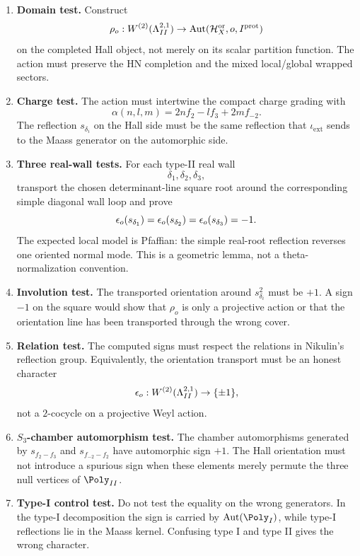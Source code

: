\begin{enumerate}
\item \textbf{Domain test.}  Construct
\[
\rho_o:W^{(2)}(\Lambda^{2,1}_{II})\to\operatorname{Aut}(\mathcal H_X^{\mathrm{or}},o,I^{\mathrm{prot}})
\]
on the completed Hall object, not merely on its scalar partition
function.  The action must preserve the HN completion and the mixed
local/global wrapped sectors.

\item \textbf{Charge test.}  The action must intertwine the compact
charge grading with
\[
        \alpha(n,l,m)=2nf_2-lf_3+2mf_{-2}.
\]
The reflection \(s_{\delta_i}\) on the Hall side must be the same
reflection that \(\iota_{\mathrm{ext}}\) sends to the Maass generator on
the automorphic side.

\item \textbf{Three real-wall tests.}  For each type-II real wall
\[
\delta_1,\delta_2,\delta_3,
\]
transport the chosen determinant-line square root around the corresponding
simple diagonal wall loop and prove
\[
        \epsilon_o(s_{\delta_1})
        =
        \epsilon_o(s_{\delta_2})
        =
        \epsilon_o(s_{\delta_3})
        =
        -1 .
\]
The expected local model is Pfaffian: the simple real-root reflection
reverses one oriented normal mode.  This is a geometric lemma, not a
theta-normalization convention.

\item \textbf{Involution test.}  The transported orientation around
\(s_{\delta_i}^2\) must be \(+1\).  A sign \(-1\) on the square would
show that \(\rho_o\) is only a projective action or that the orientation
line has been transported through the wrong cover.

\item \textbf{Relation test.}  The computed signs must respect the
relations in Nikulin's reflection group.  Equivalently, the orientation
transport must be an honest character
\[
        \epsilon_o:W^{(2)}(\Lambda^{2,1}_{II})\to\{\pm1\},
\]
not a \(2\)-cocycle on a projective Weyl action.

\item \textbf{\(S_3\)-chamber automorphism test.}  The chamber
automorphisms generated by \(s_{f_2-f_3}\) and \(s_{f_{-2}-f_2}\) have
automorphic sign \(+1\).  The Hall orientation must not introduce a
spurious sign when these elements merely permute the three null vertices
of \(\Poly_{II}\).

\item \textbf{Type-I control test.}  Do not test the equality on the
wrong generators.  In the type-I decomposition the sign is carried by
\(\Aut(\Poly_I)\), while type-I reflections lie in the Maass kernel.
Confusing type I and type II gives the wrong character.


\end{enumerate}
